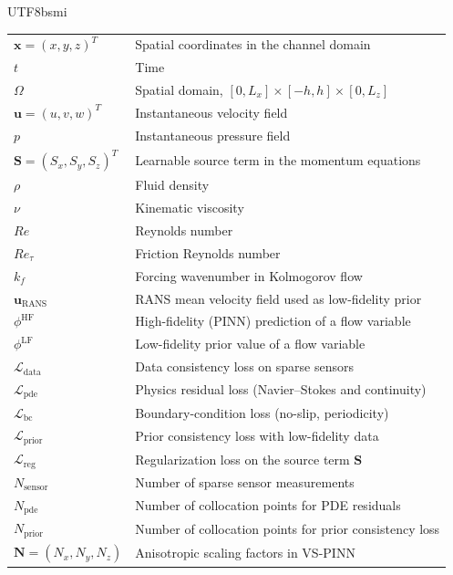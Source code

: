 \documentclass[master]{NTHUthesis}
\begin{document}
\begin{CJK*}{UTF8}{bsmi}
\begin{tabular}{ll}
$\mathbf{x} = (x,y,z)^T$ & Spatial coordinates in the channel domain \\
$t$ & Time \\
$\Omega$ & Spatial domain, $[0,L_x]\times[-h,h]\times[0,L_z]$ \\
$\mathbf{u} = (u,v,w)^T$ & Instantaneous velocity field \\
$p$ & Instantaneous pressure field \\
$\mathbf{S} = (S_x,S_y,S_z)^T$ & Learnable source term in the momentum equations \\
$\rho$ & Fluid density \\
$\nu$ & Kinematic viscosity \\
$Re$ & Reynolds number \\
$Re_\tau$ & Friction Reynolds number \\
$k_f$ & Forcing wavenumber in Kolmogorov flow \\
$\mathbf{u}_{\text{RANS}}$ & RANS mean velocity field used as low-fidelity prior \\
$\phi^{\text{HF}}$ & High-fidelity (PINN) prediction of a flow variable \\
$\phi^{\text{LF}}$ & Low-fidelity prior value of a flow variable \\
$\mathcal{L}_{\text{data}}$ & Data consistency loss on sparse sensors \\
$\mathcal{L}_{\text{pde}}$ & Physics residual loss (Navier--Stokes and continuity) \\
$\mathcal{L}_{\text{bc}}$ & Boundary-condition loss (no-slip, periodicity) \\
$\mathcal{L}_{\text{prior}}$ & Prior consistency loss with low-fidelity data \\
$\mathcal{L}_{\text{reg}}$ & Regularization loss on the source term $\mathbf{S}$ \\
$N_{\text{sensor}}$ & Number of sparse sensor measurements \\
$N_{\text{pde}}$ & Number of collocation points for PDE residuals \\
$N_{\text{prior}}$ & Number of collocation points for prior consistency loss \\
$\mathbf{N}=(N_x,N_y,N_z)$ & Anisotropic scaling factors in VS-PINN \\
\end{tabular}



\end{CJK*}
\end{document}
